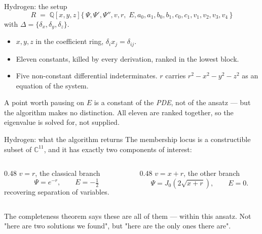 \documentclass[10pt,aspectratio=169]{beamer}
\newcommand{\C}{\mathbb{C}}
\newcommand{\Q}{\mathbb{Q}}
\begin{document}
\begin{frame}{Hydrogen: the setup}
\[
  R \;=\; \Q[x,y,z]\{\,\Psi, \Psi', \Psi'', v, r,\;
     E, a_{0}, a_{1}, b_{0}, b_{1}, c_{0}, c_{1}, v_{1}, v_{2}, v_{3}, v_{4}\,\}
\]
with $\Delta = \{\delta_{x},\delta_{y},\delta_{z}\}$.

\pause
\begin{itemize}
  \item $x,y,z$ in the coefficient ring, $\delta_{i}x_{j} = \delta_{ij}$.
  \item Eleven \alert{constants}, killed by every derivation, ranked in the
        lowest block.
  \item Five non-constant differential indeterminates. $r$ carries
        $r^{2}-x^{2}-y^{2}-z^{2}$ as an equation of the system.
\end{itemize}

\pause
\begin{alertblock}{A point worth pausing on}
$E$ is a constant of the \emph{PDE}, not of the ansatz --- but the algorithm makes
no distinction. All eleven are ranked together, so the \alert{eigenvalue is solved
for, not supplied}.
\end{alertblock}
\end{frame}

\begin{frame}{Hydrogen: what the algorithm returns}
The membership locus is a constructible subset of $\C^{11}$, and it has exactly
two components of interest:

\medskip
\begin{columns}[T]
\begin{column}{0.48\textwidth}
$v = r$, the classical branch
\[
  \Psi = e^{-r}, \qquad E = -\tfrac{1}{2}
\]
recovering separation of variables.
\end{column}
\begin{column}{0.48\textwidth}
$v = x+r$, the other branch
\[
  \Psi = J_{0}(2\sqrt{x+r}), \qquad E = 0 .
\]
\end{column}
\end{columns}

\pause
\bigskip
\begin{alertblock}{}
The completeness theorem says these are \alert{all} of them --- within this
ansatz. Not "here are two solutions we found", but "here are the only ones there
are".
\end{alertblock}
\end{frame}
\end{document}
